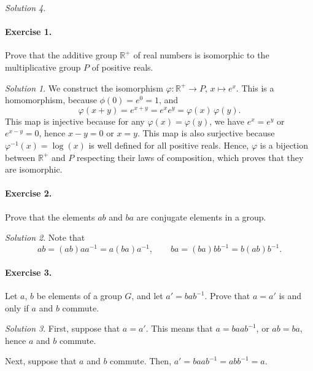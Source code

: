 \documentclass[11pt]{report}
\def\R{\mathbb{R}}
\theoremstyle{remark}
\newtheorem*{solution}{Solution}
\begin{document}
\begin{solution}
    \paragraph{Exercise 1.} Prove that the additive group $\R^+$ of real numbers is
    isomorphic to the multiplicative group $P$ of positive reals.
    \begin{solution}
        We construct the isomorphism $\varphi\colon \R^+ \to P$, $x \mapsto e^x$.
        This is a homomorphism, because $\phi(0) = e^0 = 1$, and \[
            \varphi(x + y) = e^{x + y} = e^xe^y = \varphi(x)\,\varphi(y).
        \] This map is injective because for any $\varphi(x) = \varphi(y)$, we have
        $e^x = e^y$ or $e^{x - y} = 0$, hence $x - y = 0$ or $x = y$. This map is
        also surjective because $\varphi^{-1}(x) = \log(x)$ is well defined for all
        positive reals. Hence, $\varphi$ is a bijection between $\R^+$ and $P$
        respecting their laws of composition, which proves that they are isomorphic.
    \end{solution}
    
    \paragraph{Exercise 2.} Prove that the elements $ab$ and $ba$ are conjugate
    elements in a group.
    \begin{solution}
        Note that \[
            ab = (ab)aa^{-1} = a(ba)a^{-1}, \qquad
            ba = (ba)bb^{-1} = b(ab)b^{-1}.
        \] 
    \end{solution}
    
    \paragraph{Exercise 3.} Let $a$, $b$ be elements of a group $G$, and let $a' =
    bab^{-1}$. Prove that $a = a'$ is and only if $a$ and $b$ commute.
    \begin{solution}
        First, suppose that $a = a'$. This means that $a = b a ab^{-1}$, or $ab =
        ba$, hence $a$ and $b$ commute.

        Next, suppose that $a$ and $b$ commute. Then, $a' = ba a b^{-1} = abb^{-1} =
        a$.
    \end{solution}


\end{solution}
\end{document}
